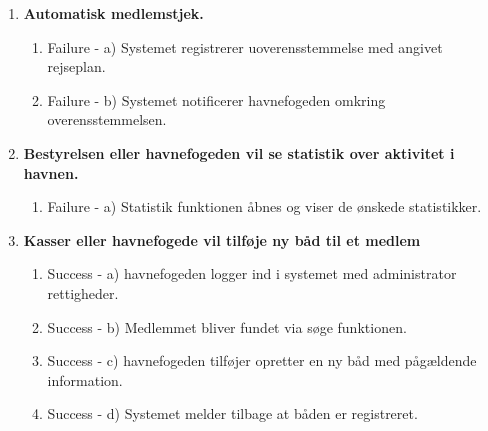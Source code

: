 \begin{enumerate}
	\item{\bf{Automatisk medlemstjek.}}
	  \begin{enumerate}
			\item Failure -  a) Systemet registrerer uoverensstemmelse med angivet rejseplan.
			\item Failure -  b) Systemet notificerer havnefogeden omkring overensstemmelsen.
	   \end{enumerate}
    
	\item{\bf{Bestyrelsen eller havnefogeden vil se statistik over aktivitet i havnen.}}
	  \begin{enumerate}
			\item Failure -  a) Statistik funktionen åbnes og viser de ønskede statistikker.
	   \end{enumerate}
			
	\item{\bf{Kasser eller havnefogede vil tilføje ny båd til et medlem}}
	  \begin{enumerate}
		\item Success - a) havnefogeden logger ind i systemet med administrator rettigheder.
		\item Success - b) Medlemmet bliver fundet via søge funktionen.
		\item Success - c) havnefogeden tilføjer opretter en ny båd med pågældende information.
		\item Success - d) Systemet melder tilbage at båden er registreret.
	   \end{enumerate}

\end{enumerate}